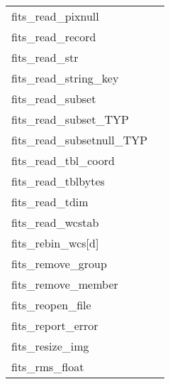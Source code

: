 \documentclass[11pt]{book}
\begin{document}
\begin{tabular}{lr}
fits\_read\_pixnull & \pageref{ffgpxf} \\
fits\_read\_record       & \pageref{ffgrec} \\
fits\_read\_str         & \pageref{ffgcrd} \\
fits\_read\_string\_key & \pageref{ffgsky} \\
fits\_read\_subset  & \pageref{ffgsv} \\
fits\_read\_subset\_TYP  & \pageref{ffgsvx} \pageref{ffgsvx2}\\
fits\_read\_subsetnull\_TYP & \pageref{ffgsfx} \pageref{ffgsfx2} \\
fits\_read\_tbl\_coord & \pageref{ffgtcs} \\
fits\_read\_tblbytes    & \pageref{ffgtbb} \\
fits\_read\_tdim         & \pageref{ffgtdm} \\
fits\_read\_wcstab       & \pageref{wcstab} \\
fits\_rebin\_wcs[d]  &  \pageref{rebinwcs} \\
fits\_remove\_group  & \pageref{ffgtrm} \\
fits\_remove\_member   & \pageref{ffgmrm} \\
fits\_reopen\_file      & \pageref{ffreopen} \\
fits\_report\_error   & \pageref{ffrprt} \\
fits\_resize\_img     & \pageref{ffrsim} \\
fits\_rms\_float      & \pageref{imageRMS} \\
\end{tabular}
\end{document}
